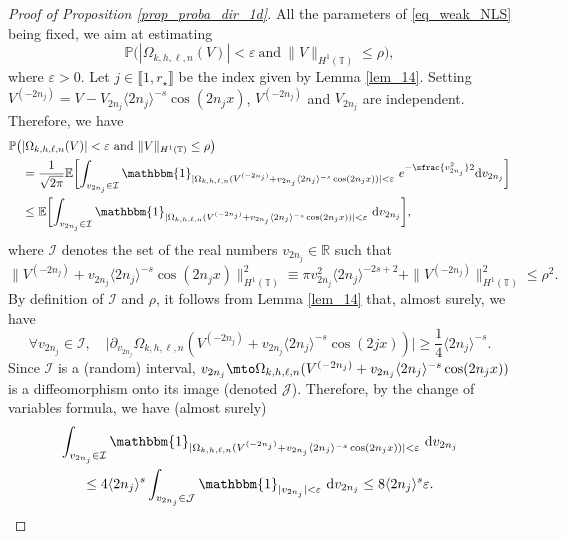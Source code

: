 \begin{proof}[Proof of Proposition \ref{prop_proba_dir_1d}]
All the parameters of \eqref{eq_weak_NLS} being fixed, we aim at estimating
\[
\mathbb{P}\big(|\Omega_{k,h,\ell,n}(V)| < \varepsilon \ \text{and} \ \| V\|_{H^1(\mathbb{T})} \leq \rho \big),
\]
where $\varepsilon>0$. Let $j \in \llbracket 1,r_{\star} \rrbracket$ be the index given by Lemma \ref{lem_14}. Setting $V^{(-2n_j)} = V- V_{2n_j} \langle 2n_j \rangle^{-s} \cos(2n_jx)$, $V^{(-2n_j)}$ and $V_{2n_j}$ are independent. Therefore, we have
\begin{equation}
\label{eq_J_reviendrai}
\begin{split}
\mathbb{P}\big(&|\Omega_{k,h,\ell,n}(V)| < \varepsilon \ \text{and} \ \| V\|_{H^1(\mathbb{T})} \leq \rho \big)\\
&= \frac1{\sqrt{2\pi}}\mathbb{E} \biggl[\int_{v_{2n_j} \in \mathcal{I}} \mathbbm{1}_{|\Omega_{k,h,\ell,n}(V^{(-2n_j)}+ v_{2n_j} \langle 2n_j \rangle^{-s} \cos(2n_jx))| < \varepsilon } \ e^{-\sfrac{v_{2n_j}^2}2}\mathrm{d}v_{2n_j} \biggr] \\
&\leq \mathbb{E} \biggl[\int_{v_{2n_j} \in \mathcal{I}} \mathbbm{1}_{|\Omega_{k,h,\ell,n}(V^{(-2n_j)}+ v_{2n_j} \langle 2n_j \rangle^{-s} \cos(2n_jx))| < \varepsilon } \ \mathrm{d}v_{2n_j} \biggr],
\end{split}
\end{equation}
where $\mathcal{I}$ denotes the set of the real numbers $v_{2n_j} \in \mathbb{R}$ such that
\[
\| V^{(-2n_j)}+ v_{2n_j} \langle 2n_j \rangle^{-s} \cos(2n_jx) \|_{H^1(\mathbb{T})}^2 \equiv \pi v_{2n_j}^2 \langle 2n_j \rangle^{-2s+2} + \| V^{(-2n_j)}\|_{H^1(\mathbb{T})}^2 \leq \rho^2.
\]
By definition of $\mathcal{I}$ and $\rho$, it follows from Lemma \ref{lem_14} that, almost surely, we have
\[
\forall v_{2n_j} \in \mathcal{I}, \quad \bigl |\partial_{v_{2n_j}} \Omega_{k,h,\ell,n}(V^{(-2n_j)}+ v_{2n_j} \langle 2n_j \rangle^{-s} \cos(2jx)) \bigr| \geq \frac14 \langle 2n_j \rangle^{-s}.
\]
Since $\mathcal{I}$ is a (random) interval, $v_{2n_j} \mto \Omega_{k,h,\ell,n}(V^{(-2n_j)}+ v_{2n_j} \langle 2n_j \rangle^{-s} \cos(2n_jx))$ is a diffeomorphism onto its image (denoted $\mathcal{J}$). Therefore, by the change of variables formula, we have (almost surely)
\begin{multline*}
\int_{v_{2n_j} \in \mathcal{I}} \mathbbm{1}_{|\Omega_{k,h,\ell,n}(V^{(-2n_j)}+ v_{2n_j} \langle 2n_j \rangle^{-s} \cos(2n_jx))| < \varepsilon } \ \mathrm{d}v_{2n_j} \\
\leq 4 \langle 2n_j \rangle^{s} \int_{v_{2n_j} \in \mathcal{J}} \mathbbm{1}_{|v_{2n_j}| < \varepsilon } \ \mathrm{d}v_{2n_j} \leq 8 \langle 2n_j \rangle^{s} \varepsilon.

\end{multline*}
\end{proof}
